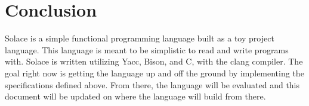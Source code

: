 \documentclass{article}
\begin{document}
\section{Conclusion}

Solace is a simple functional programming language built as a toy project language. This language is meant to be simplistic to read and write programs with.
Solace is written utilizing Yacc, Bison, and C, with the clang compiler. The goal right now is getting the language up and off the ground by implementing the
specifications defined above. From there, the language will be evaluated and this document will be updated on where the language will build from there.
\end{document}
